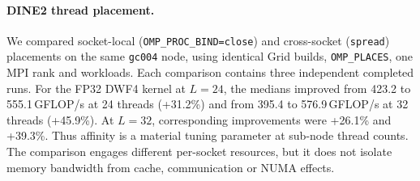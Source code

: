 \paragraph{DINE2 thread placement.}
We compared socket-local (\texttt{OMP\_PROC\_BIND=close}) and cross-socket
(\texttt{spread}) placements on the same \texttt{gc004} node, using identical
Grid builds, \texttt{OMP\_PLACES}, one MPI rank and workloads. Each comparison
contains three independent completed runs. For the FP32 DWF4 kernel at
$L=24$, the medians improved from 423.2 to 555.1\,GFLOP/s at 24 threads
(+31.2\%) and from 395.4 to 576.9\,GFLOP/s at 32 threads (+45.9\%). At
$L=32$, corresponding improvements were +26.1\% and +39.3\%. Thus affinity
is a material tuning parameter at sub-node thread counts. The comparison
engages different per-socket resources, but it does not isolate memory
bandwidth from cache, communication or NUMA effects.

